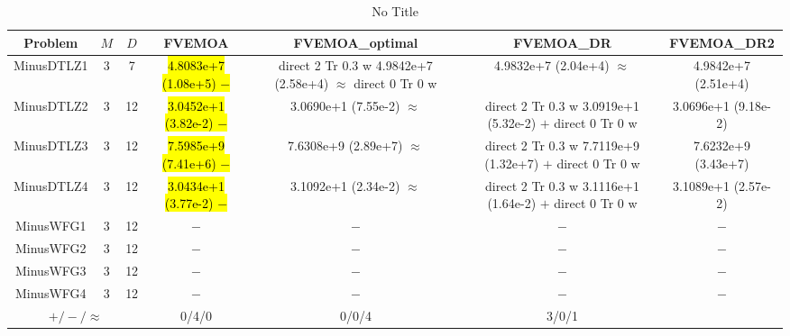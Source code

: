 \documentclass[journal]{IEEEtran}
\newcommand{\semitextbf}[1]{%
\pdfliteral direct {2 Tr 0.3 w} %
#1%
\pdfliteral direct {0 Tr 0 w}%
}
\begin{document}
\begin{table*}[htbp]
\renewcommand{\arraystretch}{1.2}
\centering
\caption{No Title}
\begin{tabular}{ccccccc}
\toprule
Problem&$M$&$D$&FVEMOA&FVEMOA\_optimal&FVEMOA\_DR&FVEMOA\_DR2\\
\midrule
\multirow{1}{*}{MinusDTLZ1}&3&7&\hl{4.8083e+7 (1.08e+5) $-$}&\semitextbf{4.9842e+7 (2.58e+4) $\approx$}&4.9832e+7 (2.04e+4) $\approx$&4.9842e+7 (2.51e+4)\\
\hline
\multirow{1}{*}{MinusDTLZ2}&3&12&\hl{3.0452e+1 (3.82e-2) $-$}&3.0690e+1 (7.55e-2) $\approx$&\semitextbf{3.0919e+1 (5.32e-2) $+$}&3.0696e+1 (9.18e-2)\\
\hline
\multirow{1}{*}{MinusDTLZ3}&3&12&\hl{7.5985e+9 (7.41e+6) $-$}&7.6308e+9 (2.89e+7) $\approx$&\semitextbf{7.7119e+9 (1.32e+7) $+$}&7.6232e+9 (3.43e+7)\\
\hline
\multirow{1}{*}{MinusDTLZ4}&3&12&\hl{3.0434e+1 (3.77e-2) $-$}&3.1092e+1 (2.34e-2) $\approx$&\semitextbf{3.1116e+1 (1.64e-2) $+$}&3.1089e+1 (2.57e-2)\\
\hline
\multirow{1}{*}{MinusWFG1}&3&12&$-$&$-$&$-$&$-$\\
\hline
\multirow{1}{*}{MinusWFG2}&3&12&$-$&$-$&$-$&$-$\\
\hline
\multirow{1}{*}{MinusWFG3}&3&12&$-$&$-$&$-$&$-$\\
\hline
\multirow{1}{*}{MinusWFG4}&3&12&$-$&$-$&$-$&$-$\\
\hline
\multicolumn{3}{c}{$+/-/\approx$}&0/4/0&0/0/4&3/0/1&\\
\bottomrule
\end{tabular}
\label{No Label}
\end{table*}
\end{document}
